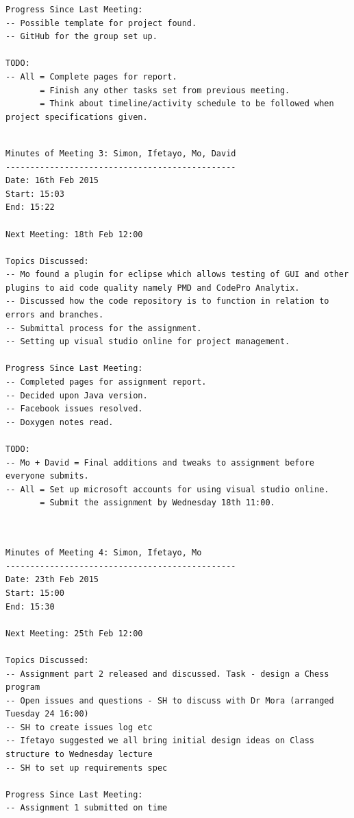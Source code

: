 \documentclass[a4paper,10pt]{article}
\begin{document}
\begin{appendices}
\begin{lstlisting}[frame=single,caption=Meeting of 11/2/15,label=minutes2]
Progress Since Last Meeting:
-- Possible template for project found.
-- GitHub for the group set up.

TODO:
-- All = Complete pages for report.
       = Finish any other tasks set from previous meeting.
       = Think about timeline/activity schedule to be followed when project specifications given.

\end{lstlisting}

\begin{lstlisting}[frame=single,caption=Meeting of 16/2/15,label=minutes3]

Minutes of Meeting 3: Simon, Ifetayo, Mo, David
-----------------------------------------------
Date: 16th Feb 2015
Start: 15:03
End: 15:22

Next Meeting: 18th Feb 12:00

Topics Discussed:
-- Mo found a plugin for eclipse which allows testing of GUI and other plugins to aid code quality namely PMD and CodePro Analytix.
-- Discussed how the code repository is to function in relation to errors and branches.
-- Submittal process for the assignment.
-- Setting up visual studio online for project management.

Progress Since Last Meeting:
-- Completed pages for assignment report.
-- Decided upon Java version.
-- Facebook issues resolved.
-- Doxygen notes read.

TODO:
-- Mo + David = Final additions and tweaks to assignment before everyone submits.
-- All = Set up microsoft accounts for using visual studio online.
       = Submit the assignment by Wednesday 18th 11:00.


\end{lstlisting}

\begin{lstlisting}[frame=single,caption=Meeting of 23/2/15,label=minutes4]

Minutes of Meeting 4: Simon, Ifetayo, Mo
-----------------------------------------------
Date: 23th Feb 2015
Start: 15:00
End: 15:30

Next Meeting: 25th Feb 12:00

Topics Discussed:
-- Assignment part 2 released and discussed. Task - design a Chess program
-- Open issues and questions - SH to discuss with Dr Mora (arranged Tuesday 24 16:00)
-- SH to create issues log etc
-- Ifetayo suggested we all bring initial design ideas on Class structure to Wednesday lecture
-- SH to set up requirements spec

Progress Since Last Meeting:
-- Assignment 1 submitted on time


\end{lstlisting}
\end{appendices}
\end{document}

